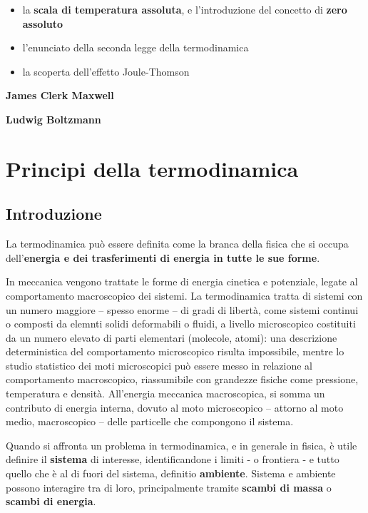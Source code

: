 \begin{itemize}
        \begin{itemize}
            \item la \textbf{scala di temperatura assoluta}, e l'introduzione del concetto di \textbf{zero assoluto}
            \item l'enunciato della seconda legge della termodinamica
            \item la scoperta dell'effetto Joule-Thomson
        \end{itemize}
    {\color{red}
    \item \textbf{James Clerk Maxwell}
    \item \textbf{Ludwig Boltzmann}
    }
\end{itemize}


\chapter{Principi della termodinamica}\label{thermodynamics:principles}
\section{Introduzione}
\begin{definition}[Termodinamica] La termodinamica può essere definita come la branca della fisica che si occupa dell'\textbf{energia e dei trasferimenti di energia in tutte le sue forme}.
\end{definition}
In meccanica vengono trattate le forme di energia cinetica e potenziale, legate al comportamento macroscopico dei sistemi. La termodinamica tratta di sistemi con un numero maggiore -- spesso enorme -- di gradi di libertà, come sistemi continui o composti da elemnti solidi deformabili o fluidi, a livello microscopico costituiti da un numero elevato di parti elementari (molecole, atomi): una descrizione deterministica del comportamento microscopico risulta impossibile, mentre lo studio statistico dei moti microscopici può essere messo in relazione al comportamento macroscopico, riassumibile con grandezze fisiche come pressione, temperatura e densità. All'energia meccanica macroscopica, si somma un contributo di energia interna, dovuto al moto microscopico -- attorno al moto medio, macroscopico -- delle particelle che compongono il sistema.

\begin{definition} Quando si affronta un problema in termodinamica, e in generale in fisica, è utile definire il \textbf{sistema} di interesse, identificandone i limiti - o frontiera - e tutto quello che è al di fuori del sistema, definitio \textbf{ambiente}. Sistema e ambiente possono interagire tra di loro, principalmente tramite \textbf{scambi di massa} o \textbf{scambi di energia}.
\end{definition}

